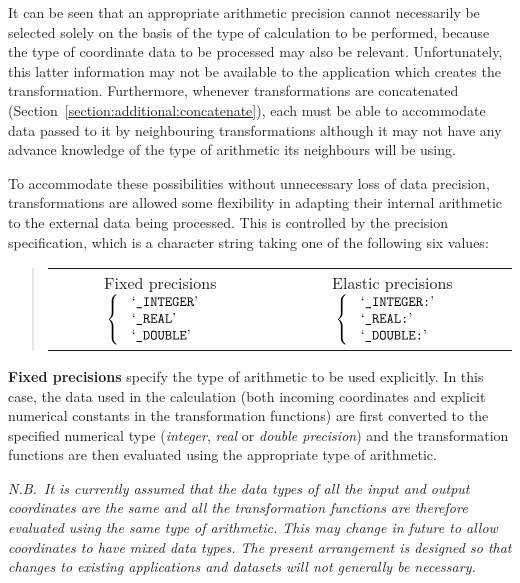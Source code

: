 \documentclass[twoside,11pt]{article}
\renewcommand{\_}{\texttt{\symbol{95}}}
\begin{document}
It can be seen that an appropriate arithmetic precision cannot necessarily
be selected solely on the basis of the type of calculation to be performed,
because the type of coordinate data to be processed may also be relevant.
Unfortunately, this latter information may not be available to the
application which creates the transformation.
Furthermore, whenever transformations are concatenated
(Section~\ref{section:additional:concatenate}), each must be able to
accommodate data passed to it by neighbouring transformations although it
may not have any advance knowledge of the type of arithmetic its neighbours
will be using.

To accommodate these possibilities without unnecessary loss of data
precision, transformations are allowed some flexibility in adapting their
internal arithmetic to the external data being processed.
This is controlled by the precision specification, which is a character
string taking one of the following six values:

\begin{quote}
\begin{center}
\begin{tabular}{cc}

Fixed precisions $\left\{ \mbox{
\begin{tabular}{l}
`{\tt \_INTEGER}'\\
`{\tt \_REAL}'\\
`{\tt \_DOUBLE}'
\end{tabular} } \right.$
& Elastic precisions $\left\{ \mbox{
\begin{tabular}{l}
`{\tt \_INTEGER:}'\\
`{\tt \_REAL:}'\\
`{\tt \_DOUBLE:}'
\end{tabular} } \right.$

\end{tabular}
\end{center}
\end{quote}

\textbf{Fixed precisions} specify the type of arithmetic to be used explicitly.
In this case, the data used in the calculation (both incoming coordinates
and explicit numerical constants in the transformation functions) are first
converted to the specified numerical type (\emph{integer}, \emph{real} or
\emph{ double precision}) and the transformation functions are then evaluated
using the appropriate type of arithmetic.

\emph{N.B.\ It is currently assumed that the data types of all the input and
output coordinates are the same and all the transformation functions are
therefore evaluated using the same type of arithmetic.
This may change in future to allow coordinates to have mixed data types.
The present arrangement is designed so that changes to existing applications
and datasets will not generally be necessary.}
\end{document}
